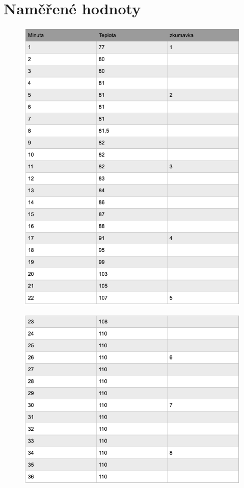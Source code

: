 \documentclass[13pt, a4paper, twoside]{article}
\begin{document}
\section*{Naměřené hodnoty}
\begin{figure}[H]
    \centering
    \includegraphics[width=6.5in]{uloha_8_tab_1.png}
\end{figure}
\newpage
\begin{figure}[H]
    \centering
    \includegraphics[width=6.5in]{uloha_8_tab_2.png}
\end{figure}
\end{document}
